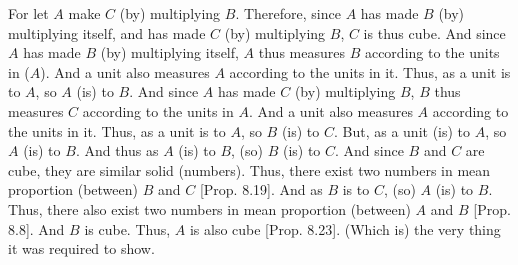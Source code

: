 \begin{Parallel}{}{}
{For let $A$ make $C$ (by) multiplying $B$. Therefore, since $A$
has made $B$ (by) multiplying itself, and has made $C$ (by) multiplying 
$B$, $C$ is thus cube. And since $A$ has made $B$ (by)
multiplying itself, $A$ thus measures $B$ according to the units in ($A$).
And a unit also measures $A$ according to the units in it. Thus, as
a unit is to $A$, so $A$ (is) to $B$. And since $A$ has made $C$ (by)
multiplying $B$, $B$ thus measures $C$ according to the units in $A$.
And a unit also measures $A$ according to the units in it. Thus, as
a unit is to $A$, so $B$ (is) to $C$. But, as a unit (is) to $A$, so $A$ (is)
to $B$. And thus as $A$ (is) to $B$, (so) $B$ (is) to $C$. And since $B$
and $C$ are cube, they are similar solid (numbers). Thus,
there exist two numbers in mean proportion (between) $B$ and $C$ [Prop. 8.19]. And as $B$ is to $C$, (so) $A$ (is)
to $B$. Thus, there also exist two numbers in mean proportion (between) $A$ and
$B$ [Prop. 8.8].  And $B$ is  cube. Thus, $A$
is also  cube   [Prop. 8.23]. (Which is)
the very thing it was required to show.}
\end{Parallel}

